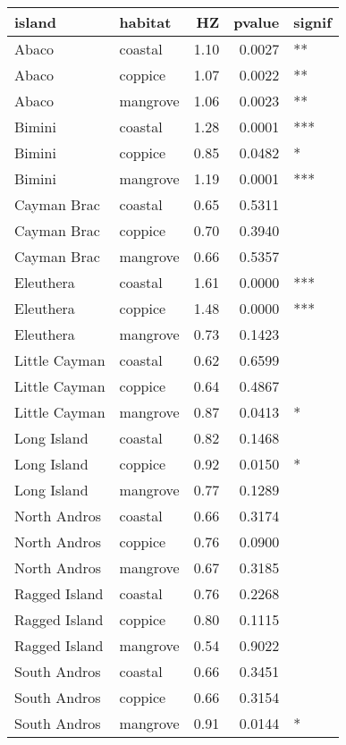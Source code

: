 
\begin{tabular}{llrrl}
\toprule
island & habitat & HZ & pvalue & signif\\
\midrule
Abaco & coastal & 1.10 & 0.0027 & **\\
Abaco & coppice & 1.07 & 0.0022 & **\\
Abaco & mangrove & 1.06 & 0.0023 & **\\
Bimini & coastal & 1.28 & 0.0001 & ***\\
Bimini & coppice & 0.85 & 0.0482 & *\\
\addlinespace
Bimini & mangrove & 1.19 & 0.0001 & ***\\
Cayman Brac & coastal & 0.65 & 0.5311 & \\
Cayman Brac & coppice & 0.70 & 0.3940 & \\
Cayman Brac & mangrove & 0.66 & 0.5357 & \\
Eleuthera & coastal & 1.61 & 0.0000 & ***\\
\addlinespace
Eleuthera & coppice & 1.48 & 0.0000 & ***\\
Eleuthera & mangrove & 0.73 & 0.1423 & \\
Little Cayman & coastal & 0.62 & 0.6599 & \\
Little Cayman & coppice & 0.64 & 0.4867 & \\
Little Cayman & mangrove & 0.87 & 0.0413 & *\\
\addlinespace
Long Island & coastal & 0.82 & 0.1468 & \\
Long Island & coppice & 0.92 & 0.0150 & *\\
Long Island & mangrove & 0.77 & 0.1289 & \\
North Andros & coastal & 0.66 & 0.3174 & \\
North Andros & coppice & 0.76 & 0.0900 & \\
\addlinespace
North Andros & mangrove & 0.67 & 0.3185 & \\
Ragged Island & coastal & 0.76 & 0.2268 & \\
Ragged Island & coppice & 0.80 & 0.1115 & \\
Ragged Island & mangrove & 0.54 & 0.9022 & \\
South Andros & coastal & 0.66 & 0.3451 & \\
\addlinespace
South Andros & coppice & 0.66 & 0.3154 & \\
South Andros & mangrove & 0.91 & 0.0144 & *\\
\bottomrule
\end{tabular}
